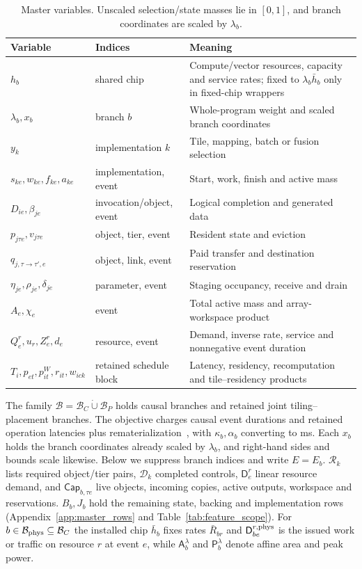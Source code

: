 \begin{table}[t]
\centering\small\renewcommand{\arraystretch}{1.25}
\caption{Master variables. Unscaled selection/state masses lie in $[0,1]$, and branch coordinates are scaled by $\lambda_b$.}
\label{tab:var_digest}\label{tab:v1_scale}
\begin{tabularx}{\linewidth}{@{}l l X@{}}
\toprule
Variable & Indices & Meaning \\
\midrule
$h_b$ & shared chip & Compute/vector resources, capacity and service rates; fixed to $\lambda_b\bar h_b$ only in fixed-chip wrappers \\
$\lambda_b,x_b$ & branch $b$ & Whole-program weight and scaled branch coordinates \\
$y_k$ & implementation $k$ & Tile, mapping, batch or fusion selection \\
$s_{ke},w_{ke},f_{ke},a_{ke}$ & implementation, event & Start, work, finish and active mass \\
$D_{ie},\beta_{je}$ & invocation/object, event & Logical completion and generated data \\
$p_{j\tau e},v_{j\tau e}$ & object, tier, event & Resident state and eviction \\
$q_{j,\tau\to\tau',e}$ & object, link, event & Paid transfer and destination reservation \\
$\eta_{je},\rho_{je},\delta_{je}$ & parameter, event & Staging occupancy, receive and drain \\
$A_e,\chi_e$ & event & Total active mass and array-workspace product \\
$Q^r_e,u_r,Z^r_e,d_e$ & resource, event & Demand, inverse rate, service and nonnegative event duration \\
$T_i,p_{et},p^W_{it},r_{it},w_{ick}$ & retained schedule block & Latency, residency, recomputation and tile--residency products \\
\bottomrule
\end{tabularx}
\end{table}

The family $\mathcal B=\mathcal B_C\mathbin{\dot\cup}\mathcal B_P$ holds causal branches and retained joint tiling--placement branches.
The objective charges causal event durations and retained operation latencies plus rematerialization~\citep{chen2016trainingdeepnetssublinear}, with $\kappa_b,\alpha_b$ converting to ms.
Each $x_b$ holds the branch coordinates already scaled by $\lambda_b$, and right-hand sides and bounds scale likewise.
Below we suppress branch indices and write $E=E_b$.
$\mathcal R_k$ lists required object/tier pairs, $\mathcal D_k$ completed controls, $\mathsf D^r_e$ linear resource demand, and $\mathsf{Cap}_{b,\tau e}$ live objects, incoming copies, active outputs, workspace and reservations.
$B_b,J_b$ hold the remaining state, backing and implementation rows (Appendix~\ref{app:master_rows} and Table~\ref{tab:feature_scope}).
For $b\in\mathcal B_{\rm phys}\subseteq\mathcal B_C$ the installed chip $\bar h_b$ fixes rates $\bar R_{br}$ and $\mathsf D^{r,\rm phys}_{be}$ is the issued work or traffic on resource $r$ at event $e$, while $\mathsf A_b^\lambda$ and $\mathsf P_b^\lambda$ denote affine area and peak power.

